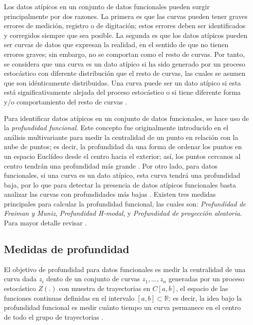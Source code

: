 \documentclass[
]{book}
\begin{document}
Los datos atípicos en un conjunto de datos funcionales pueden surgir principalmente por dos razones. La primera es que las curvas pueden tener graves errores de medición, registro o de digitación; estos errores deben ser identificados y corregidos siempre que sea posible. La segunda es que los datos atípicos pueden ser curvas de datos que expresan la realidad, en el sentido de que no tienen errores graves; sin embargo, no se comportan como el resto de curvas. Por tanto, se considera que una curva es un dato atípico si ha sido generado por un proceso estocástico con diferente distribución que el resto de curvas, las cuales se asumen que son idénticamente distribuidas. Una curva puede ser un dato atípico si esta está significativamente alejada del proceso estocástico o si tiene diferente forma y/o comportamiento del resto de curvas \citep{oviedo}.

Para identificar datos atípicos en un conjunto de datos funcionales, se hace uso de la \emph{profundidad funcional}. Este concepto fue originalmente introducido en el análisis multivariante para medir la centralidad de un punto en relación con la nube de puntos; es decir, la profundidad da una forma de ordenar los puntos en un espacio Euclídeo desde el centro hacia el exterior; así, los puntos cercanos al centro tendrán una profundidad más grande \citep{pinero}. Por otro lado, para datos funcionales, si una curva es un dato atípico, esta curva tendrá una profundidad baja, por lo que para detectar la presencia de datos atípicos funcionales basta analizar las curvas con profundidades más bajas \citep{oviedo}. Existen tres medidas principales para calcular la profundidad funcional, las cuales son: \emph{Profundidad de Fraiman y Muniz}, \emph{Profundidad H-modal}, y \emph{Profundidad de proyección aleatoria}. Para mayor detalle revisar \citep{manuel}.

\hypertarget{medidas-de-profundidad}{%
\subsection{Medidas de profundidad}\label{medidas-de-profundidad}}

El objetivo de profundidad para datos funcionales es medir la centralidad de una curva dada \(z_i\) dento de un conjunto de curvas \(z_1,...,z_n\) generadas por un proceso estocástico \(Z(.)\) con muestra de trayectorias en \(C[a,b]\), el espacio de las funciones continuas definidas en el intervalo \([a,b]\subset \mathbb{R}\); es decir, la idea bajo la profundidad funcional es medir cuánto tiempo un curva permanece en el centro de todo el grupo de trayectorias \citep{manuel}.
\end{document}
